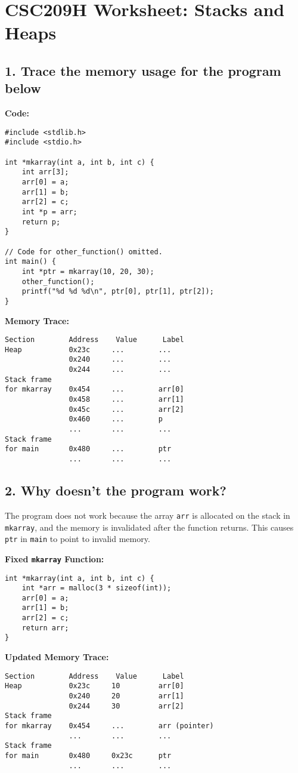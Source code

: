\documentclass[12pt]{article}
\begin{document}
\section*{CSC209H Worksheet: Stacks and Heaps}

\subsection*{1. Trace the memory usage for the program below}

\textbf{Code:}
\begin{lstlisting}
#include <stdlib.h>
#include <stdio.h>

int *mkarray(int a, int b, int c) {
    int arr[3];
    arr[0] = a;
    arr[1] = b;
    arr[2] = c;
    int *p = arr;
    return p;
}

// Code for other_function() omitted.
int main() {
    int *ptr = mkarray(10, 20, 30);
    other_function();
    printf("%d %d %d\n", ptr[0], ptr[1], ptr[2]);
}
\end{lstlisting}

\textbf{Memory Trace:}
\begin{verbatim}
Section        Address    Value      Label
Heap           0x23c     ...        ...
               0x240     ...        ...
               0x244     ...        ...
Stack frame
for mkarray    0x454     ...        arr[0]
               0x458     ...        arr[1]
               0x45c     ...        arr[2]
               0x460     ...        p
               ...       ...        ...
Stack frame
for main       0x480     ...        ptr
               ...       ...        ...
\end{verbatim}

\subsection*{2. Why doesn't the program work?}
The program does not work because the array \texttt{arr} is allocated on the stack in \texttt{mkarray}, and the memory is invalidated after the function returns. This causes \texttt{ptr} in \texttt{main} to point to invalid memory.

\textbf{Fixed \texttt{mkarray} Function:}
\begin{lstlisting}
int *mkarray(int a, int b, int c) {
    int *arr = malloc(3 * sizeof(int));
    arr[0] = a;
    arr[1] = b;
    arr[2] = c;
    return arr;
}
\end{lstlisting}

\textbf{Updated Memory Trace:}
\begin{verbatim}
Section        Address    Value      Label
Heap           0x23c     10         arr[0]
               0x240     20         arr[1]
               0x244     30         arr[2]
Stack frame
for mkarray    0x454     ...        arr (pointer)
               ...       ...        ...
Stack frame
for main       0x480     0x23c      ptr
               ...       ...        ...
\end{verbatim}
\end{document}
